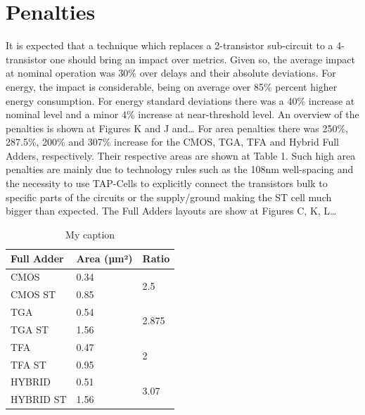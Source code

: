 \documentclass[ecp,tc, english]{iiufrgs}
\begin{document}
\section{Penalties}
It is expected that a technique which replaces a 2-transistor sub-circuit to a 4-transistor one should bring an impact over metrics. Given so, the average impact at nominal operation was 30\% over delays and their absolute deviations. For energy, the impact is considerable, being on average over 85\% percent higher energy consumption. For energy standard deviations there was a 40\% increase at nominal level and a minor 4\% increase at near-threshold level. An overview of the penalties is shown at Figures K and J and…
For area penalties there was 250\%, 287.5\%, 200\% and 307\% increase for the CMOS, TGA, TFA and Hybrid Full Adders, respectively. Their respective areas are shown at Table 1. Such high area penalties are mainly due to technology rules such as the 108nm well-spacing and the necessity to use TAP-Cells to explicitly connect the transistors bulk to specific parts of the circuits or the supply/ground making the ST cell much bigger than expected. The Full Adders layouts are show at Figures C, K, L…

\begin{table}[H]
\centering
\caption{My caption}
\label{my-label}
\begin{tabular}{|l|l|l|}
\hline
\textbf{Full Adder} & \textbf{Area (µm²)} & \textbf{Ratio} \\ \hline
CMOS & 0.34 & \multirow{2}{*}{2.5} \\ \cline{1-2}
CMOS ST & 0.85 &  \\ \hline
TGA & 0.54 & \multirow{2}{*}{2.875} \\ \cline{1-2}
TGA ST & 1.56 &  \\ \hline
TFA & 0.47 & \multirow{2}{*}{2} \\ \cline{1-2}
TFA ST & 0.95 &  \\ \hline
HYBRID & 0.51 & \multirow{2}{*}{3.07} \\ \cline{1-2}
HYBRID ST & 1.56 &  \\ \hline
\end{tabular}
\end{table}
\end{document}
